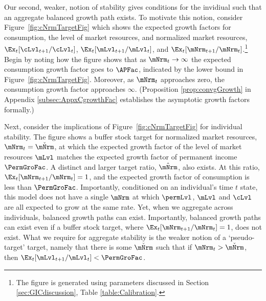 \documentclass[\econtexRoot/BufferStockTheory]{subfiles}
\begin{document}
Our second, weaker, notion of stability gives conditions for the invidiual such that an aggregate balanced growth path exists. To motivate this notion, consider Figure~\ref{fig:cNrmTargetFig} which shows the expected growth factors for consumption, the level of market resources, and normalized market resources, $\Ex_{t}[\cLvl_{t+1}/\cLvl_{t}]$, $\Ex_{t}[\mLvl_{t+1}/\mLvl_{t}]$, and $\Ex_{t}[\mNrm_{t+1}/\mNrm_{t}]$.\footnote{The figure is generated using parameters discussed in Section \ref{sec:GICdiscussion}, Table \ref{table:Calibration}.}
Begin by noting how the figure shows that as $\mNrm_{t} \rightarrow \infty$ the expected consumption growth factor goes to ${\APFac}$, indicated by the lower bound in Figure~\ref{fig:cNrmTargetFig}.
Moreover, as $\mNrm_{t}$ approaches zero, the consumption growth factor approaches $\infty$.
(Proposition  \ref{prop:convgGrowth}  in Appendix \ref{subsec:AppxCgrowthFac} establishes the asymptotic growth factors formally.)

Next, consider the implications of Figure~\ref{fig:cNrmTargetFig} for individual stability.
The figure shows a buffer stock target for normalized market resources, $\mNrm_{t} = \mBalLvl$, at which the expected growth factor of the level of market resources $\mLvl$ matches the expected growth factor of permanent income $\PermGroFac$.
A distinct and larger target ratio, $\mTrgNrm$, also exists.
At this ratio, $\Ex_{t}[\mNrm_{t+1}/\mNrm_{t}]=1$, and the expected growth factor of consumption is less than $\PermGroFac$.
Importantly, conditioned on an individual's time $t$ state, this model does not have a single $\mNrm$ at which $\permLvl$, $\mLvl$ and $\cLvl$ are all expected to grow at the same rate.
Yet, when we aggregate across individuals, balanced growth paths can exist. 
Importantly, balanced growth paths can exist even if a buffer stock target, where $\Ex_{t}[\mNrm_{t+1}/\mNrm_{t}]=1$, does not exist. 
What we require for aggregate stability is the weaker notion of a `pseudo-target' target, namely that there is some ${\mBalLvl}$ such that if $\mNrm_{t}>{\mBalLvl}$, then $\Ex_{t}[\mLvl_{t+1}/\mLvl_{t}] < \PermGroFac$.






\providecommand{\figName}{cNrmTargetFig} 
\providecommand{\figFile}{\figName} %
\renewcommand{\figName}{cNrmTargetFig} 
\hypertarget{\figFile}{}

\end{document}
